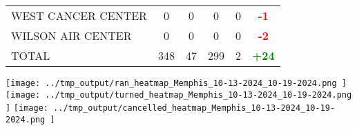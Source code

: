 \documentclass{article}
\begin{document}
\begin{longtable}{l|cccc|c}
    
        WEST CANCER CENTER & 0 & 0 & 0 & 0 & \textcolor{red}{\textbf{-1}} \\
    

    
        WILSON AIR CENTER & 0 & 0 & 0 & 0 & \textcolor{red}{\textbf{-2}} \\
    

    
        \hline
    

    
        TOTAL & 348 & 47 & 299 & 2 & \textcolor{green}{\textbf{+24}} \\
    

\bottomrule
\end{longtable}

\clearpage

\texttt{[image:  ../tmp\_output/ran\_heatmap\_Memphis\_10-13-2024\_10-19-2024.png ]}
\texttt{[image:  ../tmp\_output/turned\_heatmap\_Memphis\_10-13-2024\_10-19-2024.png ]}
\texttt{[image:  ../tmp\_output/cancelled\_heatmap\_Memphis\_10-13-2024\_10-19-2024.png ]}
\end{document}

